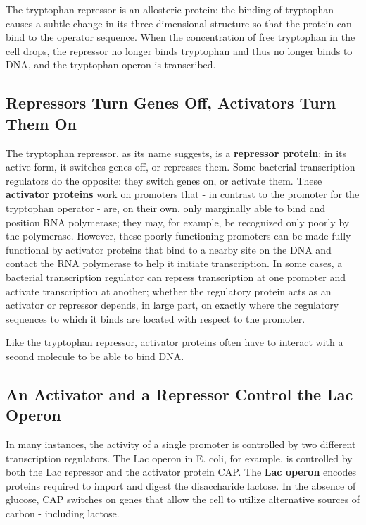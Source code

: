 The tryptophan repressor is an allosteric protein: the
binding of tryptophan causes a subtle change in its three-dimensional
structure so that the protein can bind to the operator sequence. When
the concentration of free tryptophan in the cell drops, the repressor no
longer binds tryptophan and thus no longer binds to DNA, and the tryptophan
operon is transcribed.

\subsection{Repressors Turn Genes Off, Activators Turn Them On}

The tryptophan repressor, as its name suggests, is a \textbf{repressor protein}:
in its active form, it switches genes off, or represses them. Some bacterial
transcription regulators do the opposite: they switch genes on, or activate
them. These \textbf{activator proteins} work on promoters that - in contrast to
the promoter for the tryptophan operator - are, on their own, only marginally
able to bind and position RNA polymerase; they may, for example,
be recognized only poorly by the polymerase. However, these poorly
functioning promoters can be made fully functional by activator proteins
that bind to a nearby site on the DNA and contact the RNA polymerase to
help it initiate transcription. In some cases, a bacterial transcription
regulator can repress transcription at one promoter and activate
transcription at another; whether the regulatory protein acts as an activator
or repressor depends, in large part, on exactly where the regulatory
sequences to which it binds are located with respect to the promoter.

Like the tryptophan repressor, activator proteins often have to interact
with a second molecule to be able to bind DNA.

\subsection{An Activator and a Repressor Control the Lac Operon}

In many instances, the activity of a single promoter is controlled by two
different transcription regulators. The Lac operon in E. coli, for example,
is controlled by both the Lac repressor and the activator protein CAP. The
\textbf{Lac operon} encodes proteins required to import and digest the disaccharide
lactose. In the absence of glucose, CAP switches on genes that
allow the cell to utilize alternative sources of carbon - including lactose.

